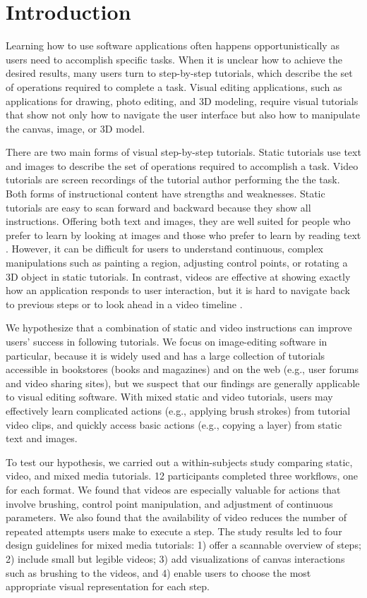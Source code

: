 \section{Introduction}

Learning how to use software applications often happens opportunistically as users need to accomplish specific tasks. When it is unclear how to achieve the desired results, many users turn to step-by-step tutorials, which describe the set of operations required to complete a task. Visual editing applications, such as applications for drawing, photo editing, and 3D modeling, require visual tutorials that show not only how to navigate the user interface but also how to manipulate the canvas, image, or 3D model.

There are two main forms of visual step-by-step tutorials. Static tutorials use text and images to describe the set of operations required to accomplish a task. Video tutorials are screen recordings of the tutorial author performing the the task. Both forms of instructional content have strengths and weaknesses. Static tutorials are easy to scan forward and backward because they show all instructions. Offering both text and images, they are well suited for people who prefer to learn by looking at images and those who prefer to learn by reading text \cite{Harrison:1995uh}. However, it can be difficult for users to understand continuous, complex manipulations such as painting a region, adjusting control points, or rotating a 3D object in static tutorials. In contrast, videos are effective at showing exactly how an application responds to user interaction, but it is hard to navigate back to previous steps or to look ahead in a video timeline \cite{Pongnumkul:2011ju}.

We hypothesize that a combination of static and video instructions can improve users’ success in following tutorials. We focus on image-editing software in particular, because it is widely used and has a large collection of tutorials accessible in bookstores (books and magazines) and on the web (e.g., user forums and video sharing sites), but we suspect that our findings are generally applicable to visual editing software. With mixed static and video tutorials, users may effectively learn complicated actions (e.g., applying brush strokes) from tutorial video clips, and quickly access basic actions (e.g., copying a layer) from static text and images.

To test our hypothesis, we carried out a within-subjects study comparing static, video, and mixed media tutorials. 12 participants completed three workflows, one for each format. We found that videos are especially valuable for actions that involve brushing, control point manipulation, and adjustment of continuous parameters. We also found that the availability of video reduces the number of repeated attempts users make to execute a step. The study results led to four design guidelines for mixed media tutorials: 1) offer a scannable overview of steps; 2) include small but legible videos; 3) add visualizations of canvas interactions such as brushing to the videos, and 4) enable users to choose the most appropriate visual representation for each step.

